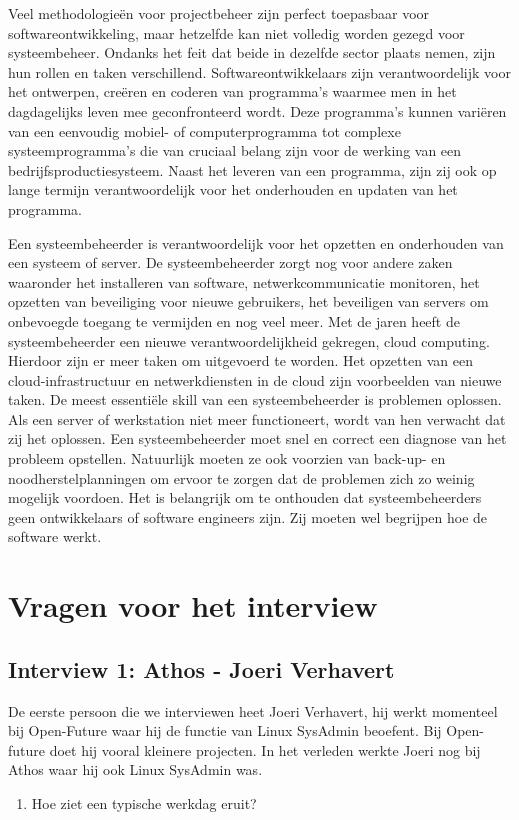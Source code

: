\documentclass{hogent-article}
\begin{document}
    Veel methodologieën voor projectbeheer zijn perfect toepasbaar voor softwareontwikkeling, maar hetzelfde kan niet volledig worden gezegd voor systeembeheer. Ondanks het feit dat beide in dezelfde sector plaats nemen, zijn hun rollen en taken verschillend. Softwareontwikkelaars zijn verantwoordelijk voor het ontwerpen, creëren en coderen van programma’s waarmee men in het dagdagelijks leven mee geconfronteerd wordt. Deze programma’s kunnen variëren van een eenvoudig mobiel- of computerprogramma tot complexe systeemprogramma's die van cruciaal belang zijn voor de werking van een bedrijfsproductiesysteem. Naast het leveren van een programma, zijn zij ook op lange termijn verantwoordelijk voor het onderhouden en updaten van het programma. 
    
    Een systeembeheerder is verantwoordelijk voor het opzetten en onderhouden van een systeem of server. De systeembeheerder zorgt nog voor andere zaken waaronder het installeren van software, netwerkcommunicatie monitoren, het opzetten van beveiliging voor nieuwe gebruikers, het beveiligen van servers om onbevoegde toegang te vermijden en nog veel meer. Met de jaren heeft de systeembeheerder een nieuwe verantwoordelijkheid gekregen, cloud computing. Hierdoor zijn er meer taken om uitgevoerd te worden. Het opzetten van een cloud-infrastructuur en netwerkdiensten in de cloud zijn voorbeelden van nieuwe taken. De meest essentiële skill van een systeembeheerder is problemen oplossen. Als een server of werkstation niet meer functioneert, wordt van hen verwacht dat zij het oplossen. Een systeembeheerder moet snel en correct een diagnose van het probleem opstellen. Natuurlijk moeten ze ook voorzien van back-up- en noodherstelplanningen om ervoor te zorgen dat de problemen zich zo weinig mogelijk voordoen. Het is belangrijk om te onthouden dat systeembeheerders geen ontwikkelaars of software engineers zijn. Zij moeten wel begrijpen hoe de software werkt.
       
    
    \section{Vragen voor het interview}    
    \subsection{Interview 1: Athos - Joeri Verhavert}
    De eerste persoon die we interviewen heet Joeri Verhavert, hij werkt momenteel bij Open-Future waar hij de functie van Linux SysAdmin beoefent. Bij Open-future doet hij vooral kleinere projecten. In het verleden werkte Joeri nog bij Athos waar hij ook Linux SysAdmin was. 
    \\
    \begin{enumerate}\bfseries
        \item Hoe ziet een typische werkdag eruit?
    \end{enumerate}
\end{document}
